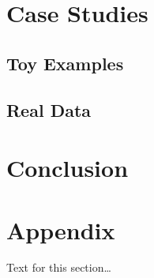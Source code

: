 \documentclass{bmcart}
\begin{document}
\section{Case Studies}

\subsection{Toy Examples}

\subsection{Real Data}


\section{Conclusion}


\section*{Appendix}
Text for this section\ldots

\end{document}
